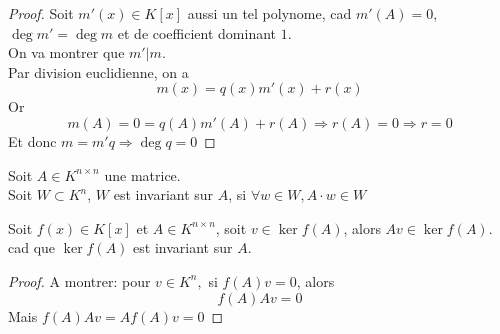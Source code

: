 \documentclass[../main.tex]{subfiles}
\begin{document}
\begin{proof}
	Soit $m'( x) \in K[x]$ aussi un tel polynome, cad $m'( A) =0$, $\deg m' = \deg m$ et de coefficient dominant $1$.\\
	On va montrer que $m'|m$.\\
	Par division euclidienne, on a 
	\[ 
		m( x) = q( x)  m'( x)  + r( x) 
	\]
Or 
\[ 
	m( A) =0 = q( A) m'( A)  + r( A)  \Rightarrow  r( A) =0 \Rightarrow r =0
\]
Et donc $m = m' q \Rightarrow \deg q =0$
\end{proof}
\begin{defn}
	Soit $A \in K^{n\times n}$ une matrice.\\
	Soit $W \subset K^{n}$, $W$ est invariant sur $A$, si $\forall w \in W, A \cdot w \in W$
\end{defn}
\begin{lemma}
	Soit $f( x) \in K[x]$ et $A \in K^{n\times n}$, soit $v \in \ker f( A) $, alors $Av \in \ker f( A)  $.\\
	cad que $\ker f( A) $ est invariant sur $A$.
\end{lemma}
\begin{proof}
	A montrer: pour $v \in K^{n},$ si $f( A) v =0 $, alors
	\[ 
		f( A) A v =0
	\]
	Mais $f( A) A v = A f( A) v =0$	
\end{proof}
 
	

	
\end{document}
